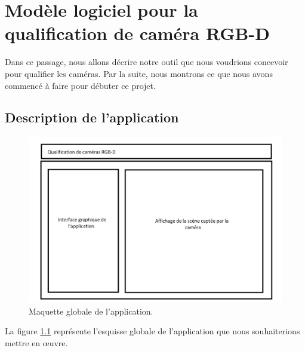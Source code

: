 \documentclass[a4paper, 12pt]{book}
\begin{document}
\chapter[Modèle logiciel pour la qualification]{Modèle logiciel pour la qualification de caméra RGB-D}
Dans ce passage, nous allons décrire notre outil que nous voudrions concevoir pour qualifier les caméras. Par la suite, nous montrons ce que nous avons commencé à faire pour débuter ce projet.


\section{Description de l'application}

\begin{center}
	\begin{figure}[H]
  		\hspace{0.1cm}
 		\includegraphics[scale=0.5]{images/maquetteApp1.png} \hspace{2cm}
  		\caption{Maquette globale de l'application.\label{fig-maquette}}
	\end{figure}
\end{center}

La figure \ref{fig-maquette} représente l'esquisse globale de l'application que nous souhaiterions mettre en œuvre. 
\end{document}
